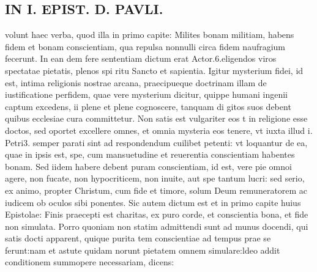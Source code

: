 \documentclass{article}
\begin{document}
\begin{pages}
\section*{IN I. EPIST. D. PAVLI. }
\marginpar{[ p.84 ]}\pstart volunt haec verba, quod illa in primo capite: Milites bonam militiam, habens fidem et bonam conscientiam, qua repulsa nonnulli circa fidem naufragium fecerunt. In ean dem fere sententiam dictum erat Actor.6.eligendos viros spectatae pietatis, plenos spi ritu Sancto et sapientia. Igitur mysterium fidei, id est, intima religionis nostrae arcana, praecipueque doctrinam illam de iustificatione perfidem, quae vere mysterium dicitur, quippe humani ingenii captum excedens, ii plene et plene cognoscere, tanquam di gitos suos debent quibus ecclesiae cura committetur. Non satis est vulgariter eos t in religione esse doctos, sed oportet excellere omnes, et omnia mysteria eos tenere, vt iuxta illud i. Petri3. semper parati sint ad respondendum cuilibet petenti: vt loquantur de ea, quae in ipsis est, spe, cum mansuetudine et reuerentia conscientiam habentes bonam. Sed iidem habere debent puram conscientiam, id est, vere pie omnoi agere, non fucate, non hypocriticem, non inuite, aut spe tantum lucri: sed serio, ex animo, propter Christum, cum fide et timore, solum Deum remuneratorem ac iudicem ob oculos sibi ponentes. Sic autem dictum est et in primo capite huius Epistolae: Finis praecepti est charitas, ex puro corde, et conscientia bona, et fide non simulata. Porro quoniam non statim admittendi sunt ad munus docendi, qui satis docti apparent, quique purita tem conscientiae ad tempus prae se ferunt:nam et astute quidam norunt pietatem omnem simulare:ldeo addit conditionem summopere necessariam, dicens:  \pend
{}
{}

\end{pages}
\end{document}
